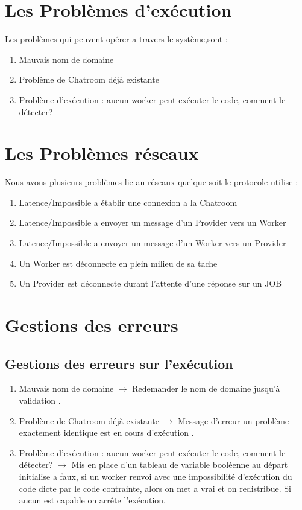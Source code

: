 \documentclass[11pt]{report}
\begin{document}
\section{Les Problèmes d'exécution}
Les problèmes qui peuvent opérer a travers le système,sont : 
\begin{enumerate}
\item Mauvais nom de domaine 
\item Problème de Chatroom déjà existante
\item Problème d'exécution : aucun worker peut exécuter le code, comment le détecter?

\end{enumerate}  

\newpage
\section{Les Problèmes réseaux}
Nous avons plusieurs problèmes lie au réseaux quelque soit le protocole utilise :
\begin{enumerate}
\item Latence/Impossible a établir une  connexion a la Chatroom
\item Latence/Impossible a envoyer un  message d'un Provider vers un Worker
\item Latence/Impossible a envoyer un  message d'un Worker vers un Provider
\item Un Worker est déconnecte en plein milieu de sa tache
\item Un Provider est déconnecte durant l'attente d'une réponse sur un JOB
\end{enumerate}
\newpage
\section{Gestions des erreurs}

\subsection{Gestions des erreurs sur l\textquoteright exécution}
\begin{enumerate}
\item Mauvais nom de domaine $ \rightarrow $ Redemander le nom de domaine jusqu'à validation .
\item Problème de Chatroom déjà existante $\rightarrow$ Message d'erreur un problème exactement identique est en cours d'exécution .
\item Problème d'exécution : aucun worker peut exécuter le code, comment le détecter? $\rightarrow$ Mis en place d'un tableau de variable booléenne au départ initialise a faux, si un worker renvoi avec une impossibilité d\textquoteright exécution du code dicte par le code contrainte, alors on met a vrai et on redistribue. Si aucun est capable on arrête l\textquoteright exécution.
\end{enumerate}  
\end{document}
